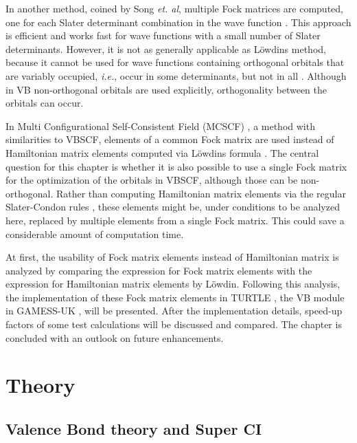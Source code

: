In another method, coined by Song \textit{et. al}, multiple Fock matrices are computed, one for each Slater determinant combination in the wave function \cite{song}. This approach is efficient and works fast for wave functions with a small number of Slater determinants. However, it is not as generally applicable as L\"{o}wdins method, because it cannot be used for wave functions containing orthogonal orbitals that are variably occupied, \textit{i.e.}, occur in some determinants, but not in all \cite{xmvb}. Although in VB non-orthogonal orbitals are used explicitly, orthogonality between the orbitals can occur.

In Multi Configurational Self-Consistent Field (MCSCF) \cite{joop,mcscf,roos1,roos2}, a method with similarities to VBSCF, elements of a common Fock matrix are used instead of Hamiltonian matrix elements computed via L\"{o}wdins formula \cite{roos1}. The central question for this chapter is whether it is also possible to use a single Fock matrix for the optimization of the orbitals in VBSCF, although those can be non-orthogonal. Rather than computing Hamiltonian matrix elements via the regular Slater-Condon rules \cite{koos3}, these elements might be, under conditions to be analyzed here, replaced by multiple elements from a single Fock matrix. This could save a considerable amount of computation time.

At first, the usability of Fock matrix elements instead of Hamiltonian matrix is analyzed by comparing the expression for Fock matrix elements with the expression for Hamiltonian matrix elements by L\"{o}wdin. Following this analysis, the implementation of these Fock matrix elements in TURTLE \cite{turtle}, the VB module in GAMESS-UK \cite{gamess}, will be presented. After the implementation details, speed-up factors of some test calculations will be discussed and compared. The chapter is concluded with an outlook on future enhancements.  

\section{Theory}

\subsection{\label{ch2.sec.vbsci}Valence Bond theory and Super CI}

